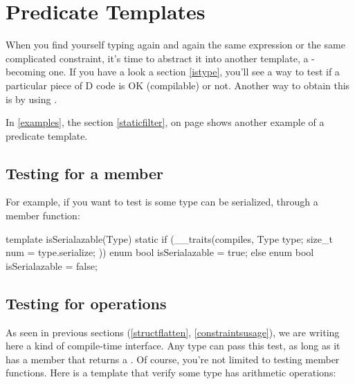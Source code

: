 \section{Predicate Templates}\label{predicates}

When you find yourself typing again and again the same  expression or the same complicated constraint, it's time to abstract it into another template, a -becoming one. If you have a look a section \ref{istype}, you'll see a way to test if a particular piece of D code is OK (compilable) or not. Another way to obtain this is by using .

In \autoref{examples}, the section \ref{staticfilter}, on page \pageref{graphcheck} shows another example of a predicate template.

\subsection{Testing for a member}

For example, if you want to test is some type can be serialized, through a  member function:

\begin{dcode}
template isSerialazable(Type)
{
    static if (__traits(compiles, {
                                   Type type;
                                   size_t num = type.serialize;
                                  }))
        enum bool isSerialazable = true;
    else
        enum bool isSerialazable = false;
}
\end{dcode}

\subsection{Testing for operations}

As seen in previous sections (\ref{structflatten}, \ref{constraintsusage}), we are writing here a kind of compile-time interface. Any type can pass this test, as long as it has a  member that returns a . Of course, you're not limited to testing member functions. Here is a template that verify some type has arithmetic operations:

